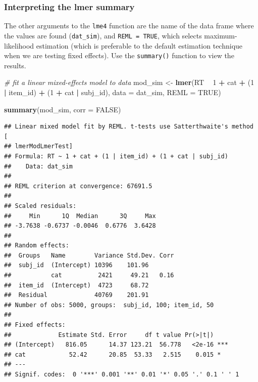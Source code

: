 \documentclass[man,floatsintext]{apa6}
\newenvironment{Shaded}{\begin{snugshade}}{\end{snugshade}}
\newcommand{\CommentTok}[1]{\textcolor[rgb]{0.56,0.35,0.01}{\textit{#1}}}
\newcommand{\DataTypeTok}[1]{\textcolor[rgb]{0.13,0.29,0.53}{#1}}
\newcommand{\DecValTok}[1]{\textcolor[rgb]{0.00,0.00,0.81}{#1}}
\newcommand{\KeywordTok}[1]{\textcolor[rgb]{0.13,0.29,0.53}{\textbf{#1}}}
\newcommand{\NormalTok}[1]{#1}
\newcommand{\OperatorTok}[1]{\textcolor[rgb]{0.81,0.36,0.00}{\textbf{#1}}}
\newcommand{\OtherTok}[1]{\textcolor[rgb]{0.56,0.35,0.01}{#1}}
\newcommand{\StringTok}[1]{\textcolor[rgb]{0.31,0.60,0.02}{#1}}
\begin{document}
\hypertarget{interpreting-the-lmer-summary}{%
\subsubsection{Interpreting the lmer summary}\label{interpreting-the-lmer-summary}}

The other arguments to the \texttt{lme4} function are the name of the data frame where the values are found (\texttt{dat\_sim}), and \texttt{REML\ =\ TRUE}, which selects maximum-likelihood estimation (which is preferable to the default estimation technique when we are testing fixed effects). Use the \texttt{summary()} function to view the results.

\begin{Shaded}
\begin{Highlighting}[]
\CommentTok{# fit a linear mixed-effects model to data}
\NormalTok{mod_sim <-}\StringTok{ }\KeywordTok{lmer}\NormalTok{(RT }\OperatorTok{~}\StringTok{ }\DecValTok{1} \OperatorTok{+}\StringTok{ }\NormalTok{cat }\OperatorTok{+}\StringTok{ }\NormalTok{(}\DecValTok{1} \OperatorTok{|}\StringTok{ }\NormalTok{item_id) }\OperatorTok{+}\StringTok{ }\NormalTok{(}\DecValTok{1} \OperatorTok{+}\StringTok{ }\NormalTok{cat }\OperatorTok{|}\StringTok{ }\NormalTok{subj_id),}
                \DataTypeTok{data =}\NormalTok{ dat_sim, }\DataTypeTok{REML =} \OtherTok{TRUE}\NormalTok{)}

\KeywordTok{summary}\NormalTok{(mod_sim, }\DataTypeTok{corr =} \OtherTok{FALSE}\NormalTok{)}
\end{Highlighting}
\end{Shaded}

\begin{verbatim}
## Linear mixed model fit by REML. t-tests use Satterthwaite's method [
## lmerModLmerTest]
## Formula: RT ~ 1 + cat + (1 | item_id) + (1 + cat | subj_id)
##    Data: dat_sim
## 
## REML criterion at convergence: 67691.5
## 
## Scaled residuals: 
##     Min      1Q  Median      3Q     Max 
## -3.7638 -0.6737 -0.0046  0.6776  3.6428 
## 
## Random effects:
##  Groups   Name        Variance Std.Dev. Corr
##  subj_id  (Intercept) 10396    101.96       
##           cat          2421     49.21   0.16
##  item_id  (Intercept)  4723     68.72       
##  Residual             40769    201.91       
## Number of obs: 5000, groups:  subj_id, 100; item_id, 50
## 
## Fixed effects:
##             Estimate Std. Error     df t value Pr(>|t|)    
## (Intercept)   816.05      14.37 123.21  56.778   <2e-16 ***
## cat            52.42      20.85  53.33   2.515    0.015 *  
## ---
## Signif. codes:  0 '***' 0.001 '**' 0.01 '*' 0.05 '.' 0.1 ' ' 1
\end{verbatim}
\end{document}
